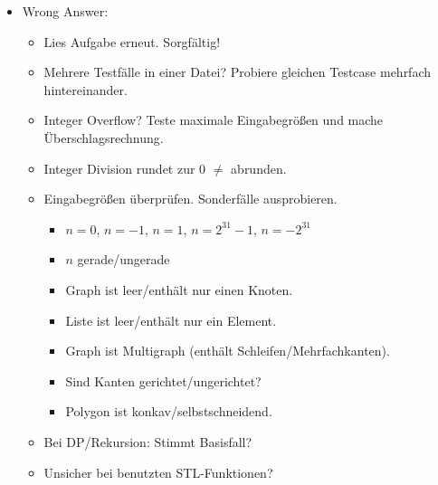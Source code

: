 \begin{itemize}
	\item Wrong Answer:
	\begin{itemize}
		\item Lies Aufgabe erneut. Sorgfältig!
		\item Mehrere Testfälle in einer Datei? Probiere gleichen Testcase mehrfach hintereinander.
		\item Integer Overflow? Teste maximale Eingabegrößen und mache Überschlagsrechnung.
		\item Integer Division rundet zur $0$ $\neq$ abrunden.
		\item Eingabegrößen überprüfen. Sonderfälle ausprobieren.
		\begin{itemize}
			\item $n = 0$, $n = -1$, $n = 1$, $n = 2^{31}-1$, $n = -2^{31}$
			\item $n$ gerade/ungerade
			\item Graph ist leer/enthält nur einen Knoten.
			\item Liste ist leer/enthält nur ein Element.
			\item Graph ist Multigraph (enthält Schleifen/Mehrfachkanten).
			\item Sind Kanten gerichtet/ungerichtet?
			\item Polygon ist konkav/selbstschneidend.
		\end{itemize}
		\item Bei DP/Rekursion: Stimmt Basisfall?
		\item Unsicher bei benutzten STL-Funktionen?
	\end{itemize}
\end{itemize}
